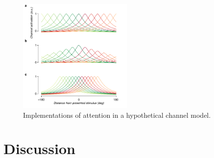 \begin{figure}
\centering
\includegraphics[keepaspectratio,width=0.5\textwidth]{figs_c4/f5_channel_attention.pdf}
\caption[Attention in channel model]{Implementations of attention in a hypothetical channel model. }
\label{fig:c4f6}
\end{figure}

\section{Discussion}

